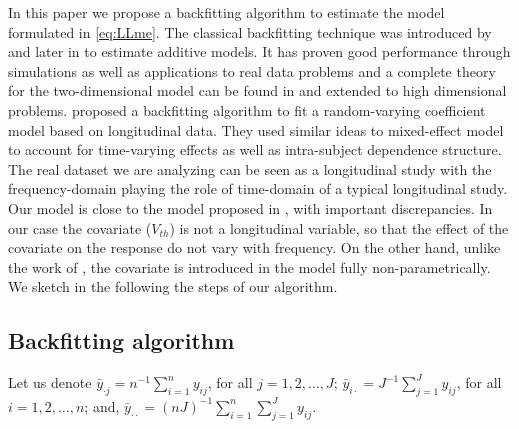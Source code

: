 \documentclass[sn-mathphys]{sn-jnl}%
\theoremstyle{thmstyleone}%
\theoremstyle{thmstyletwo}%
\theoremstyle{thmstylethree}%
\begin{document}
In this paper we propose a backfitting algorithm to estimate the model formulated in \eqref{eq:LLme}. 
The classical backfitting technique was introduced by \cite{BHT1989} and later in \cite{HT1990} to estimate additive models. It has proven good performance through simulations as well as applications to real data problems and a complete theory  for the two-dimensional model can be found in \cite{OR1997} and \cite{Opsomer2000} extended to high dimensional problems. \cite{WL2004} proposed  a backfitting algorithm to fit a random-varying coefficient model based on longitudinal data. They used similar ideas to mixed-effect model to account for time-varying effects as well as intra-subject dependence structure. The real dataset we are analyzing can be seen as a longitudinal study with the frequency-domain playing the role of time-domain of a typical longitudinal study.  Our model is close to the model proposed in \cite{WL2004}, with important discrepancies. In our case the covariate ($V_{th}$) is not a longitudinal variable, so that  the effect of the covariate on the response do not vary with frequency. On the other hand, unlike the work of \cite{WL2004}, the covariate is introduced in the model fully non-parametrically. We sketch in the following the steps of our algorithm.

\subsection{Backfitting algorithm}\label{sec:backfit}

Let us denote $\bar{y}_{\cdot j} =n^{-1}\sum_{i=1}^n y_{ij}$, for all $j=1, 2,\ldots, J$; $\bar{y}_{ i \cdot} =J^{-1}\sum_{j=1}^J y_{ij}$, for all $i=1,2,\ldots, n$; and, $\bar{y}_{\cdot \cdot} =(n  J)^{-1}\sum_{i=1}^n \sum_{j=1}^J y_{ij}$.\
\end{document}
